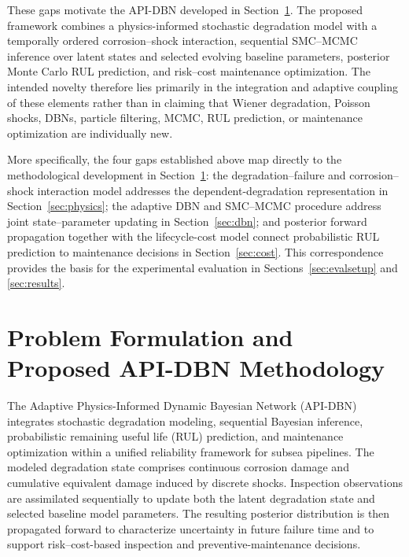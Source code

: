 \documentclass[journal]{IEEEtran}
\begin{document}
These gaps motivate the API-DBN developed in Section~\ref{sec:overview}.
The proposed framework combines a physics-informed stochastic
degradation model with a temporally ordered corrosion--shock
interaction, sequential SMC--MCMC inference over latent states and
selected evolving baseline parameters, posterior Monte Carlo RUL
prediction, and risk--cost maintenance optimization. The intended
novelty therefore lies primarily in the integration and adaptive
coupling of these elements rather than in claiming that Wiener
degradation, Poisson shocks, DBNs, particle filtering, MCMC, RUL
prediction, or maintenance optimization are individually new.

More specifically, the four gaps established above map directly to the
methodological development in Section~\ref{sec:overview}: the
degradation--failure and corrosion--shock interaction model addresses
the dependent-degradation representation in
Section~\ref{sec:physics}; the adaptive DBN and SMC--MCMC procedure
address joint state--parameter updating in Section~\ref{sec:dbn}; and
posterior forward propagation together with the lifecycle-cost model
connect probabilistic RUL prediction to maintenance decisions in
Section~\ref{sec:cost}. This correspondence provides the basis for the
experimental evaluation in Sections~\ref{sec:evalsetup} and
\ref{sec:results}.




\section{Problem Formulation and Proposed API-DBN Methodology}
\label{sec:overview}

The Adaptive Physics-Informed Dynamic Bayesian Network (API-DBN)
integrates stochastic degradation modeling, sequential Bayesian
inference, probabilistic remaining useful life (RUL) prediction, and
maintenance optimization within a unified reliability framework for
subsea pipelines. The modeled degradation state comprises continuous
corrosion damage and cumulative equivalent damage induced by discrete
shocks. Inspection observations are assimilated sequentially to update
both the latent degradation state and selected baseline model
parameters. The resulting posterior distribution is then propagated
forward to characterize uncertainty in future failure time and to
support risk--cost-based inspection and preventive-maintenance
decisions.
\end{document}
